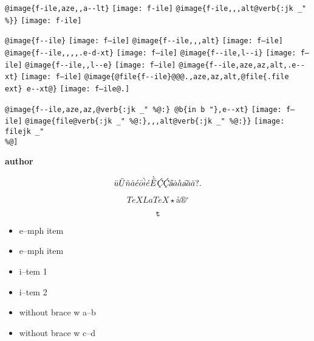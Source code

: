 \documentclass{book}
\renewcommand{\includegraphics}[1]{\fbox{FIG \detokenize{#1}}}
\begin{document}
\begin{titlepage}
\texttt{@image\{f-ile,aze{,}{,}a{-}{-}lt\}} \texttt{[image: f-ile]}
\texttt{@image\{f-ile{,}{,},alt@verb\{:jk \_" \%\@\}\}} \texttt{[image: f-ile]}

\texttt{@image\{f{-}{-}ile\}} \texttt{[image: f--ile]}
\texttt{@image\{f{-}{-}ile{,}{,},alt\}} \texttt{[image: f--ile]}
\texttt{@image\{f{-}{-}ile{,}{,}{,}{,}.e-d-xt\}} \texttt{[image: f--ile]}
\texttt{@image\{f{-}{-}ile,l{-}{-}i\}} \texttt{[image: f--ile]}
\texttt{@image\{f{-}{-}ile{,}{,}l{-}{-}e\}} \texttt{[image: f--ile]}
\texttt{@image\{f{-}{-}ile,aze,az,alt,.e{-}{-}xt\}} \texttt{[image: f--ile]}
\texttt{@image\{@file\{f{-}{-}ile\}@@@.,aze,az,alt,@file\{.file ext\}\ e{-}{-}xt@\}} \texttt{[image: f--ile@.]}

\texttt{@image\{f{-}{-}ile,aze,az,@verb\{:jk \_" \%@:\}\ @b\{in b "\},e{-}{-}xt\}} \texttt{[image: f--ile]}
\texttt{@image\{file@verb\{:jk \_" \%@:\}{,}{,},alt@verb\{:jk \_" \%@:\}\}} \texttt{[image: filejk \_" \\\%@]}


{\bfseries author}%

$$
\ddot{u} \ddot{U} \tilde{n} \hat{a} \acute{e} \bar{o} \grave{i} \acute{e} \grave{\bar{E}}
\textsl{\c{\'{C}}} \textsl{\c{\'{C}}} \textsl{\H{a}} \dot{a} \mathring{a} \textsl{\t{a}}
\breve{a} \check{a}
 ? .
$$

$$
TeX LaTeX \star{} \mathord{\text{\aa{}}} \circledR{} ^{\circ{}} 
$$

$$
\mathtt{t} 
$$

\begin{itemize}[label=\emph{}]
\item e--mph item
\end{itemize}

\begin{itemize}[label=\emph{} after emph]
\item e--mph item
\end{itemize}

\begin{itemize}[label=\textbullet{} a--n itemize line]
\item i--tem 1
\item i--tem 2
\end{itemize}

\begin{itemize}[label={}]
\item without brace w a--b
\item without brace w c--d
\end{itemize}


\end{titlepage}
\end{document}

